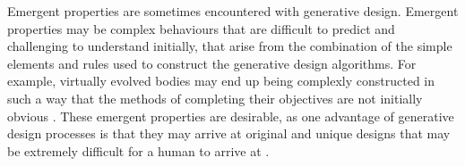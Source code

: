 Emergent properties are sometimes encountered with generative design. Emergent properties may be complex behaviours that are difficult to predict \citep{Aiguier2008} and challenging to understand initially, that arise from the combination of the simple elements and rules used to construct the generative design algorithms. For example, virtually evolved bodies may end up being complexly constructed in such a way that the methods of completing their objectives are not initially obvious \citep{Damper2000}. These emergent properties are desirable, as one advantage of generative design processes is that they may arrive at original and unique designs that may be extremely difficult for a human to arrive at \citep{Sims1994a}. 